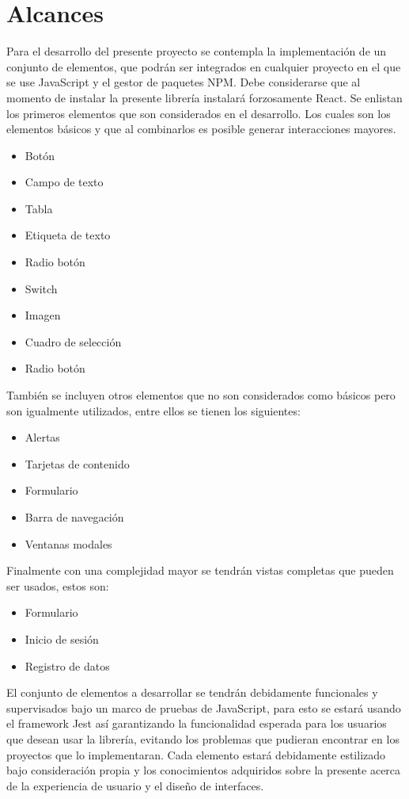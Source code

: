 \section{Alcances}

Para el desarrollo del presente proyecto se contempla la implementación de un conjunto de elementos, que podrán ser integrados en cualquier proyecto en el que se use JavaScript y el gestor de paquetes NPM. Debe considerarse que al momento de instalar la presente librería instalará forzosamente React.
 \newline
Se enlistan los primeros elementos que son considerados en el desarrollo. Los cuales son los elementos básicos y que al combinarlos es posible generar interacciones mayores.
 \newline
\begin{itemize}
\item Botón 
\item Campo de texto
\item Tabla
\item Etiqueta de texto
\item Radio botón
\item Switch
\item Imagen
\item Cuadro de selección
\item Radio botón 
\end{itemize}
 \newline
También se incluyen otros elementos que no son considerados como básicos pero son  igualmente utilizados, entre ellos se tienen los siguientes:
 \newline
 \begin{itemize}
\item  Alertas
\item Tarjetas de contenido
\item Formulario
\item Barra de navegación
\item Ventanas modales
\end{itemize}
\newline
 Finalmente con una complejidad mayor se tendrán vistas completas que pueden ser usados, estos son:
  \newline
 \begin{itemize}
\item  Formulario
\item Inicio de sesión
\item Registro de datos
\end{itemize}
\newline
El conjunto de elementos a desarrollar se tendrán debidamente funcionales y supervisados bajo un marco de pruebas de JavaScript, para esto se estará usando el framework Jest así garantizando la funcionalidad esperada para los usuarios que desean usar la librería, evitando los problemas que pudieran encontrar en los proyectos que lo implementaran. 
Cada elemento estará debidamente estilizado bajo consideración propia y los conocimientos adquiridos sobre la presente acerca de la experiencia de usuario y el diseño de interfaces.

